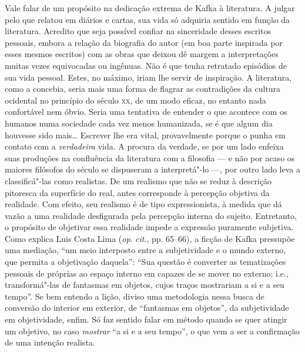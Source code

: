 Vale falar de um propósito na dedicação extrema de Kafka à literatura. A
julgar pelo que relatou em diários e cartas, sua vida só adquiria
sentido em função da literatura. Acredito que seja possível confiar na
sinceridade desses escritos pessoais, embora a relação da biografia do
autor (em boa parte inspirada por esses mesmos escritos) com as obras
que deixou dê margem a interpretações muitas vezes equivocadas ou
ingênuas. Não é que tenha retratado episódios de sua vida pessoal.
Estes, no máximo, iriam lhe servir de inspiração. A literatura, como a
concebia, seria mais uma forma de flagrar as contradições da cultura
ocidental no princípio do século \textsc{xx}, de um modo eficaz, no entanto nada
confortável nem óbvio. Seria uma tentativa de entender o que acontece
com os humanos numa sociedade cada vez menos humanizada, se é que algum
dia houvesse sido mais\ldots{} Escrever lhe era vital, provavelmente porque
o punha em contato com a \textit{verdadeira} vida. A procura da
verdade, se por um lado enfeixa suas produções na confluência da
literatura com a filosofia --- e não por acaso os maiores filósofos do
século se dispuseram a interpretá"-lo ---, por outro lado leva a
classificá"-las como realistas. De um realismo que não se reduz à
descrição pitoresca da superfície do real, antes corresponde à
percepção objetiva da realidade. Com efeito, seu realismo é de tipo
expressionista, à medida que dá vazão a uma realidade desfigurada pela
percepção interna do sujeito. Entretanto, o propósito de objetivar essa
realidade impede a expressão puramente subjetiva. Como explica 
Luis Costa Lima (\textit{op}. \textit{cit}., pp. 65--66), a ficção
de Kafka pressupõe uma mediação, “um meio interposto entre a
subjetividade e o mundo externo, que permita a objetivação daquela”:
“Sua questão é converter as tematizações pessoais de próprias ao espaço
interno em capazes de se mover no externo; i.e., transformá"-las de
fantasmas em objetos, cujos traços mostrariam a si e a seu tempo”. Se
bem entendo a lição, diviso uma metodologia nessa busca de conversão do
interior em exterior, de “fantasmas em objetos”, da subjetividade em
objetividade, enfim. Só faz sentido falar em método quando se quer
atingir um objetivo, no caso \textit{mostrar} “a si e a seu tempo”, o
que vem a ser a confirmação de uma intenção realista.


